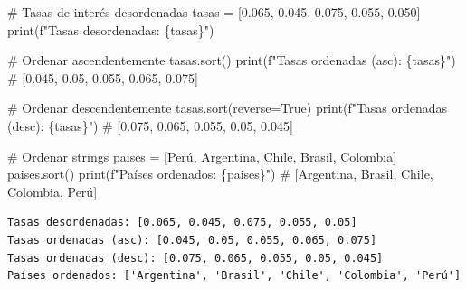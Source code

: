 \documentclass[
  doc,
  floatsintext,
  longtable,
  a4paper,
  nolmodern,
  notxfonts,
  notimes,
  12pt,
  colorlinks=true,linkcolor=blue,citecolor=blue,urlcolor=blue]{apa7}
\newenvironment{Shaded}{\begin{snugshade}}{\end{snugshade}}
\newcommand{\BuiltInTok}[1]{\textcolor[rgb]{0.00,0.23,0.31}{#1}}
\newcommand{\CommentTok}[1]{\textcolor[rgb]{0.37,0.37,0.37}{#1}}
\newcommand{\FloatTok}[1]{\textcolor[rgb]{0.68,0.00,0.00}{#1}}
\newcommand{\NormalTok}[1]{\textcolor[rgb]{0.00,0.23,0.31}{#1}}
\newcommand{\OperatorTok}[1]{\textcolor[rgb]{0.37,0.37,0.37}{#1}}
\newcommand{\SpecialCharTok}[1]{\textcolor[rgb]{0.37,0.37,0.37}{#1}}
\newcommand{\SpecialStringTok}[1]{\textcolor[rgb]{0.13,0.47,0.30}{#1}}
\newcommand{\StringTok}[1]{\textcolor[rgb]{0.13,0.47,0.30}{#1}}
\newcommand{\VariableTok}[1]{\textcolor[rgb]{0.07,0.07,0.07}{#1}}
\begin{document}
\begin{Shaded}
\begin{Highlighting}[]
\CommentTok{\# Tasas de interés desordenadas}
\NormalTok{tasas }\OperatorTok{=}\NormalTok{ [}\FloatTok{0.065}\NormalTok{, }\FloatTok{0.045}\NormalTok{, }\FloatTok{0.075}\NormalTok{, }\FloatTok{0.055}\NormalTok{, }\FloatTok{0.050}\NormalTok{]}
\BuiltInTok{print}\NormalTok{(}\SpecialStringTok{f"Tasas desordenadas: }\SpecialCharTok{\{}\NormalTok{tasas}\SpecialCharTok{\}}\SpecialStringTok{"}\NormalTok{)}

\CommentTok{\# Ordenar ascendentemente}
\NormalTok{tasas.sort()}
\BuiltInTok{print}\NormalTok{(}\SpecialStringTok{f"Tasas ordenadas (asc): }\SpecialCharTok{\{}\NormalTok{tasas}\SpecialCharTok{\}}\SpecialStringTok{"}\NormalTok{)}
\CommentTok{\# [0.045, 0.05, 0.055, 0.065, 0.075]}

\CommentTok{\# Ordenar descendentemente}
\NormalTok{tasas.sort(reverse}\OperatorTok{=}\VariableTok{True}\NormalTok{)}
\BuiltInTok{print}\NormalTok{(}\SpecialStringTok{f"Tasas ordenadas (desc): }\SpecialCharTok{\{}\NormalTok{tasas}\SpecialCharTok{\}}\SpecialStringTok{"}\NormalTok{)}
\CommentTok{\# [0.075, 0.065, 0.055, 0.05, 0.045]}

\CommentTok{\# Ordenar strings}
\NormalTok{paises }\OperatorTok{=}\NormalTok{ [}\StringTok{\textquotesingle{}Perú\textquotesingle{}}\NormalTok{, }\StringTok{\textquotesingle{}Argentina\textquotesingle{}}\NormalTok{, }\StringTok{\textquotesingle{}Chile\textquotesingle{}}\NormalTok{, }\StringTok{\textquotesingle{}Brasil\textquotesingle{}}\NormalTok{, }\StringTok{\textquotesingle{}Colombia\textquotesingle{}}\NormalTok{]}
\NormalTok{paises.sort()}
\BuiltInTok{print}\NormalTok{(}\SpecialStringTok{f"Países ordenados: }\SpecialCharTok{\{}\NormalTok{paises}\SpecialCharTok{\}}\SpecialStringTok{"}\NormalTok{)}
\CommentTok{\# [\textquotesingle{}Argentina\textquotesingle{}, \textquotesingle{}Brasil\textquotesingle{}, \textquotesingle{}Chile\textquotesingle{}, \textquotesingle{}Colombia\textquotesingle{}, \textquotesingle{}Perú\textquotesingle{}]}
\end{Highlighting}
\end{Shaded}

\begin{verbatim}
Tasas desordenadas: [0.065, 0.045, 0.075, 0.055, 0.05]
Tasas ordenadas (asc): [0.045, 0.05, 0.055, 0.065, 0.075]
Tasas ordenadas (desc): [0.075, 0.065, 0.055, 0.05, 0.045]
Países ordenados: ['Argentina', 'Brasil', 'Chile', 'Colombia', 'Perú']
\end{verbatim}
\end{document}
